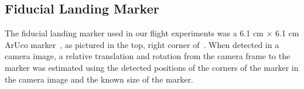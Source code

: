 
\subsection{Fiducial Landing Marker}
The fiducial landing marker used in our flight experiments was a 6.1 cm $\times$ 6.1 cm ArUco
marker~\cite{romero2018speeded}, as pictured in the top, right corner
of~.
When detected in a camera image, a relative translation and
rotation from the camera frame to the marker was estimated using the detected positions of
the corners of the marker in the camera image and the known size of the marker. 

